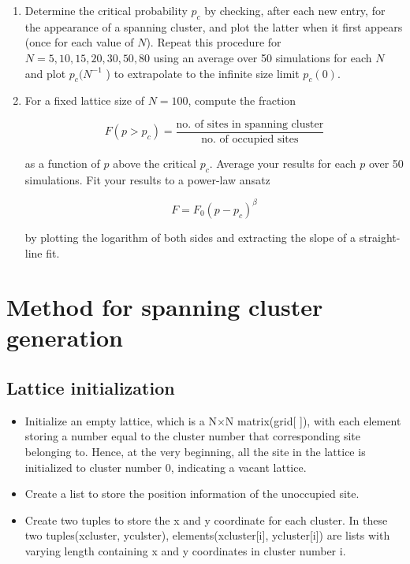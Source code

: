 \documentclass[11pt, oneside]{article}   	%
\begin{document}
\begin{enumerate}[label=(\alph*)]

\item Determine the critical probability $p_c$ by checking, after each new entry, for the appearance of a spanning cluster, and plot the latter when it first appears (once for each value of $N$). Repeat this procedure for $N = 5, 10, 15, 20, 30, 50, 80$ using an average over 50 simulations for each $N$ and plot $p_c(N^{-1}$ ) to extrapolate to the infinite size limit $p_c(0)$.

\item For a fixed lattice size of $N=100$, compute the fraction

\begin{equation}
F(p>p_c) = \frac{ \text {no. of sites in spanning cluster}} { \text {no. of occupied sites}}
\end{equation}

as a function of $p$ above the critical $p_c$. Average your results for each $p$ over 50 simulations. Fit your results to a power-law ansatz

\begin{equation}
F=F_0 (p-p_c)^\beta
\end{equation}

by plotting the logarithm of both sides and extracting the slope of a straight-line fit.

\end{enumerate}

\section{Method for spanning cluster generation}
\subsection{Lattice initialization}

\begin{itemize}
\item Initialize an empty lattice, which is a N$\times$N matrix(grid[ ]), with each element storing a number equal to the cluster number that corresponding site belonging to.  Hence, at the very beginning, all the site in the lattice is initialized to cluster number 0, indicating a vacant lattice.
\item Create a list to store the position information of the unoccupied site.
\item Create two tuples to store the x and y coordinate for each cluster. In these two tuples(xcluster, yculster),  elements(xcluster[i], ycluster[i]) are lists with varying length containing x and y coordinates in cluster number i.
\end{itemize}
\end{document}
